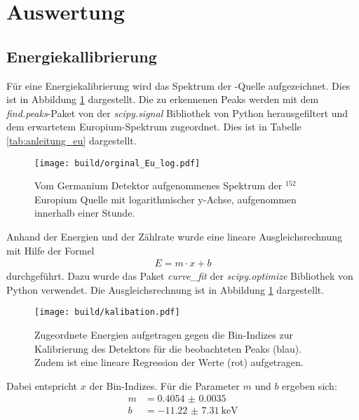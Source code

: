 \newpage
\section{Auswertung}
\label{sec:Auswertung}

\subsection{Energiekallibrierung}
\label{sec:Energiekallibrierung}

Für eine Energiekalibrierung wird das Spektrum der -Quelle
aufgezeichnet. Dies ist in Abbildung \ref{plt:Eu-Spektrum} dargestellt. Die zu
erkennenen Peaks werden mit dem \textit{find.peaks}-Paket von der \textit{scipy.signal}
Bibliothek von Python herausgefiltert und dem erwartetem Europium-Spektrum
zugeordnet. Dies ist in Tabelle \ref{tab:anleitung_eu} dargestellt.
\begin{figure}[htb]
    \centering
    \texttt{[image: build/orginal\_Eu\_log.pdf]}
  \caption{Vom Germanium Detektor aufgenommenes Spektrum der $^{152}$Europium Quelle mit
  logarithmischer y-Achse, aufgenommen innerhalb einer Stunde.}
  \label{plt:Eu-Spektrum}
\end{figure}
Anhand der Energien und der Zählrate wurde eine lineare Ausgleichsrechnung
mit Hilfe der Formel
\begin{align*}
  E = m \cdot x + b
\end{align*}
durchgeführt. Dazu wurde das Paket \textit{curve\_fit} der \textit{scipy.optimize} Bibliothek von Python verwendet. Die
Ausgleichsrechnung ist in Abbildung \ref{plt:Eu-Spektrum} dargestellt.
\begin{figure}[htb]
  \centering
  \texttt{[image: build/kalibation.pdf]}
  \caption{Zugeordnete Energien aufgetragen gegen die Bin-Indizes zur
  Kalibrierung des Detektors für die beobachteten Peaks (blau). Zudem ist eine
  lineare Regression der Werte (rot) aufgetragen.}
  \label{plt:eichung}
\end{figure}
Dabei entspricht $x$ der Bin-Indizes. Für die Parameter $m$ und
$b$ ergeben sich:
\begin{align*}
	m &= \num{0.4054(35)} \\
  b &= \SI{-11.22(731)}{\kilo\electronvolt}
\end{align*}

\FloatBarrier
